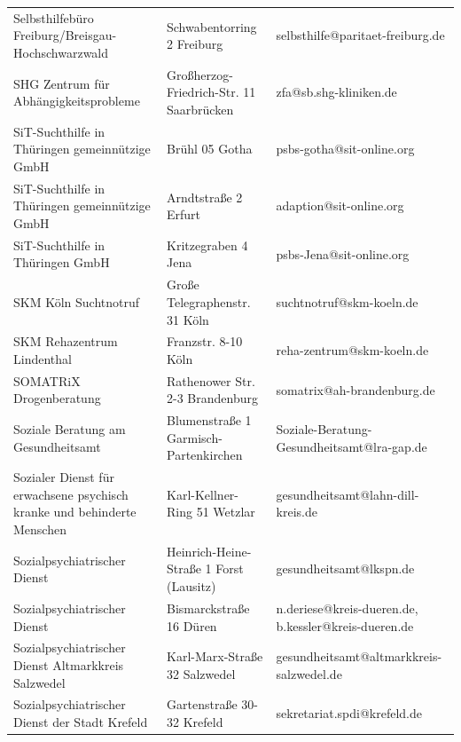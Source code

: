 {\begin{xltabular}{\textwidth} {
 >{\raggedright\arraybackslash}p{5cm}
 >{\raggedright\arraybackslash}X
 >{\raggedright\arraybackslash}p{5cm} }
Selbsthilfebüro Freiburg/Breisgau-Hochschwarzwald & Schwabentorring 2 Freiburg & selbsthilfe@paritaet-freiburg.de \\
SHG Zentrum für Abhängigkeitsprobleme & Großherzog-Friedrich-Str. 11 Saarbrücken & zfa@sb.shg-kliniken.de \\
SiT-Suchthilfe in Thüringen gemeinnützige GmbH & Brühl 05 Gotha & psbs-gotha@sit-online.org \\
SiT-Suchthilfe in Thüringen gemeinnützige GmbH & Arndtstraße 2 Erfurt & adaption@sit-online.org \\
SiT-Suchthilfe in Thüringen GmbH & Kritzegraben 4 Jena & psbs-Jena@sit-online.org \\
SKM Köln Suchtnotruf & Große Telegraphenstr. 31 Köln & suchtnotruf@skm-koeln.de \\
SKM Rehazentrum Lindenthal & Franzstr. 8-10 Köln & reha-zentrum@skm-koeln.de \\
SOMATRiX Drogenberatung & Rathenower Str. 2-3 Brandenburg & somatrix@ah-brandenburg.de \\
Soziale Beratung am Gesundheitsamt & Blumenstraße 1 Garmisch-Partenkirchen & Soziale-Beratung-Gesundheitsamt@lra-gap.de \\
Sozialer Dienst für erwachsene psychisch kranke und behinderte Menschen & Karl-Kellner-Ring 51 Wetzlar & gesundheitsamt@lahn-dill-kreis.de \\
Sozialpsychiatrischer Dienst & Heinrich-Heine-Straße 1 Forst (Lausitz) & gesundheitsamt@lkspn.de \\
Sozialpsychiatrischer Dienst & Bismarckstraße 16 Düren & n.deriese@kreis-dueren.de, b.kessler@kreis-dueren.de \\
Sozialpsychiatrischer Dienst Altmarkkreis Salzwedel & Karl-Marx-Straße 32 Salzwedel & gesundheitsamt@altmarkkreis-salzwedel.de \\
Sozialpsychiatrischer Dienst der Stadt Krefeld & Gartenstraße 30-32 Krefeld & sekretariat.spdi@krefeld.de \\

\end{xltabular}}
